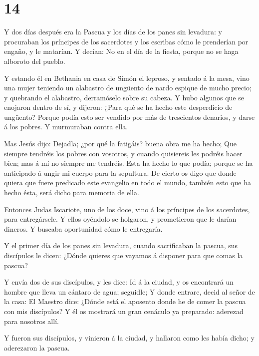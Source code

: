 \hypertarget{section-13}{%
\section{14}\label{section-13}}

 Y dos días después era la Pascua y los días de los panes
sin levadura: y procuraban los príncipes de los sacerdotes y los
escribas cómo le prenderían por engaño, y le matarían.  Y
decían: No en el día de la fiesta, porque no se haga alboroto del
pueblo.

 Y estando él en Bethania en casa de Simón el leproso, y
sentado á la mesa, vino una mujer teniendo un alabastro de ungüento de
nardo espique de mucho precio; y quebrando el alabastro, derramóselo
sobre su cabeza.  Y hubo algunos que se enojaron dentro de
sí, y dijeron: ¿Para qué se ha hecho este desperdicio de ungüento?
 Porque podía esto ser vendido por más de trescientos
denarios, y darse á los pobres. Y murmuraban contra ella.

 Mas Jesús dijo: Dejadla; ¿por qué la fatigáis? buena obra
me ha hecho;  Que siempre tendréis los pobres con vosotros,
y cuando quisiereis les podréis hacer bien; mas á mí no siempre me
tendréis.  Esta ha hecho lo que podía; porque se ha
anticipado á ungir mi cuerpo para la sepultura.  De cierto
os digo que donde quiera que fuere predicado este evangelio en todo el
mundo, también esto que ha hecho ésta, será dicho para memoria de ella.

 Entonces Judas Iscariote, uno de los doce, vino á los
príncipes de los sacerdotes, para entregársele.  Y ellos
oyéndolo se holgaron, y prometieron que le darían dineros. Y buscaba
oportunidad cómo le entregaría.

 Y el primer día de los panes sin levadura, cuando
sacrificaban la pascua, sus discípulos le dicen: ¿Dónde quieres que
vayamos á disponer para que comas la pascua?

 Y envía dos de sus discípulos, y les dice: Id á la ciudad,
y os encontrará un hombre que lleva un cántaro de agua; seguidle;
 Y donde entrare, decid al señor de la casa: El Maestro
dice: ¿Dónde está el aposento donde he de comer la pascua con mis
discípulos?  Y él os mostrará un gran cenáculo ya
preparado: aderezad para nosotros allí.

 Y fueron sus discípulos, y vinieron á la ciudad, y
hallaron como les había dicho; y aderezaron la pascua.

